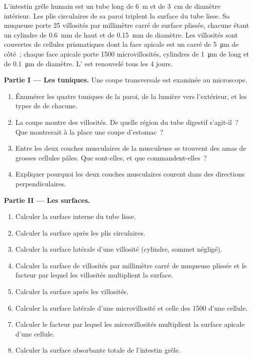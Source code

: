 \begin{problem}
\label{pb:b1:body-plans-tissues:1}
L'intestin grêle humain est un tube long de \qty{6}{m} et de \qty{3}{cm}
de diamètre intérieur. Les plis circulaires de sa paroi triplent la
surface du tube lisse. Sa muqueuse porte \qty{25}{} villosités par
millimètre carré de surface plissée, chacune étant un cylindre de
\qty{0.6}{mm} de haut et de \qty{0.15}{mm} de diamètre. Les villosités
sont couvertes de cellules prismatiques dont la face apicale est un
carré de \qty{5}{\micro m} de côté~; chaque face apicale porte
\qty{1500}{} microvillosités, cylindres de \qty{1}{\micro m} de long et
de \qty{0.1}{\micro m} de diamètre. L' est renouvelé tous les
\qty{4}{} jours.

\medskip
\noindent\textbf{Partie I --- Les tuniques.}
Une coupe transversale est examinée au microscope.
\begin{enumerate}
  \item Énumérer les quatre tuniques de la paroi, de la lumière vers
        l'extérieur, et les types de  de chacune.
  \item La coupe montre des villosités. De quelle région du tube
        digestif s'agit-il~? Que montrerait à la place une coupe
        d'estomac~?
  \item Entre les deux couches musculaires de la musculeuse se trouvent
        des amas de grosses cellules pâles. Que sont-elles, et que
        commandent-elles~?
  \item Expliquer pourquoi les deux couches musculaires courent dans des
        directions perpendiculaires.
\end{enumerate}

\medskip
\noindent\textbf{Partie II --- Les surfaces.}
\begin{enumerate}[resume]
  \item Calculer la surface interne du tube lisse.
  \item Calculer la surface après les plis circulaires.
  \item Calculer la surface latérale d'une villosité (cylindre, sommet
        négligé).
  \item Calculer la surface de villosités par millimètre carré de
        muqueuse plissée et le facteur par lequel les villosités
        multiplient la surface.
  \item Calculer la surface après les villosités.
  \item Calculer la surface latérale d'une microvillosité et celle des
        \qty{1500}{} d'une cellule.
  \item Calculer le facteur par lequel les microvillosités multiplient
        la surface apicale d'une cellule.
  \item Calculer la surface absorbante totale de l'intestin grêle.
\end{enumerate}


\end{problem}
